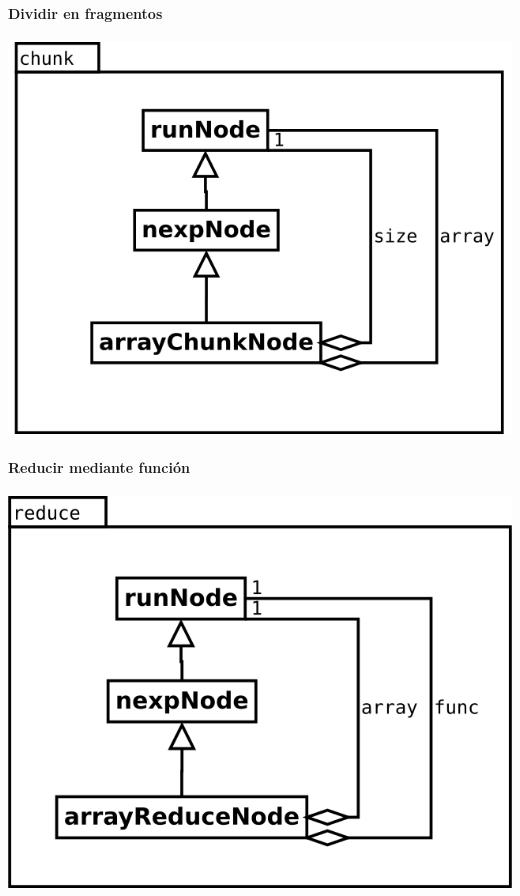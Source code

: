 \paragraph {Dividir en fragmentos}
\begin{center}
\includegraphics[scale=0.4]{chunk.png} \\
\end{center}

\paragraph {Reducir mediante función}
\begin{center}
\includegraphics[scale=0.4]{reduce.png} \\
\end{center}

